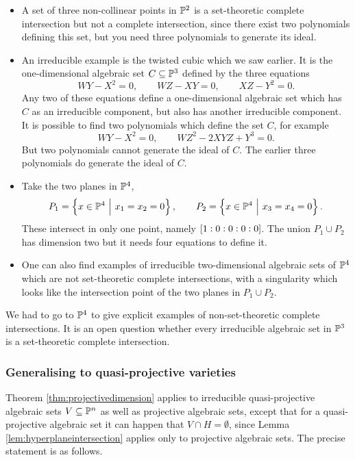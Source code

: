 \begin{example*}
\hfill
\begin{itemize}
\item A set of three non-collinear points in $ \mathbb{P}^2 $ is a set-theoretic complete intersection but not a complete intersection, since there exist two polynomials defining this set, but you need three polynomials to generate its ideal.
\item An irreducible example is the twisted cubic which we saw earlier. It is the one-dimensional algebraic set $ C \subseteq \mathbb{P}^3 $ defined by the three equations
$$ WY - X^2 = 0, \qquad WZ - XY = 0, \qquad XZ - Y^2 = 0. $$
Any two of these equations define a one-dimensional algebraic set which has $ C $ as an irreducible component, but also has another irreducible component. It is possible to find two polynomials which define the set $ C $, for example
$$ WY - X^2 = 0, \qquad WZ^2 - 2XYZ + Y^3 = 0. $$
But two polynomials cannot generate the ideal of $ C $. The earlier three polynomials do generate the ideal of $ C $.
\item Take the two planes in $ \mathbb{P}^4 $,
$$ P_1 = \cbr{x \in \PP^4 \st x_1 = x_2 = 0}, \qquad P_2 = \cbr{x \in \PP^4 \st x_3 = x_4 = 0}. $$
These intersect in only one point, namely $ \sbr{1 : 0 : 0 : 0 : 0} $. The union $ P_1 \cup P_2 $ has dimension two but it needs four equations to define it.
\item One can also find examples of irreducible two-dimensional algebraic sets of $ \mathbb{P}^4 $ which are not set-theoretic complete intersections, with a singularity which looks like the intersection point of the two planes in $ P_1 \cup P_2 $.
\end{itemize}
\end{example*}

We had to go to $ \mathbb{P}^4 $ to give explicit examples of non-set-theoretic complete intersections. It is an open question whether every irreducible algebraic set in $ \mathbb{P}^3 $ is a set-theoretic complete intersection.

\subsubsection{Generalising to quasi-projective varieties}

Theorem \ref{thm:projectivedimension} applies to irreducible quasi-projective algebraic sets $ V \subseteq \mathbb{P}^n $ as well as projective algebraic sets, except that for a quasi-projective algebraic set it can happen that $ V \cap H = \emptyset $, since Lemma \ref{lem:hyperplaneintersection} applies only to projective algebraic sets. The precise statement is as follows.

